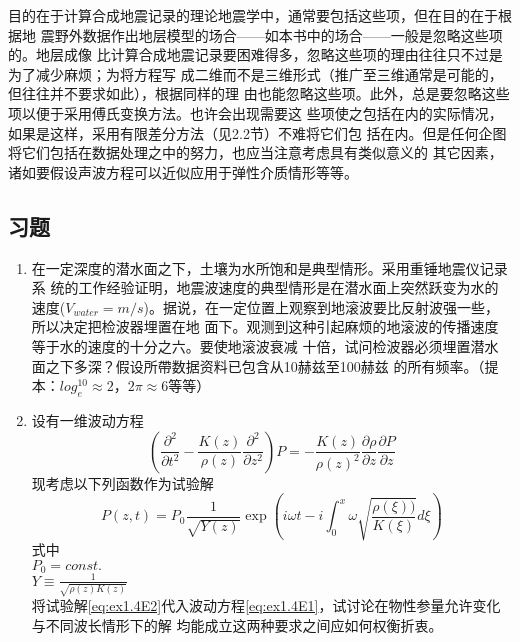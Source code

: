 目的在于计算合成地震记录的理论地震学中，通常要包括这些项，但在目的在于根据地
震野外数据作出地层模型的场合——如本书中的场合——一般是忽略这些项的。地层成像
比计算合成地震记录要困难得多，忽略这些项的理由往往只不过是为了减少麻烦；为将方程写
成二维而不是三维形式（推广至三维通常是可能的，但往往并不要求如此），根据同样的理
由也能忽略这些项。此外，总是要忽略这些项以便于采用傅氏变换方法。也许会出现需要这
些项使之包括在内的实际情况，如果是这样，采用有限差分方法（见2.2节）不难将它们包
括在内。但是任何企图将它们包括在数据处理之中的努力，也应当注意考虑具有类似意义的
其它因素，诸如要假设声波方程可以近似应用于弹性介质情形等等。

\subsection{习题}
\begin{enumerate}
\item 在一定深度的潜水面之下，土壤为水所饱和是典型情形。采用重锤地震仪记录系
统的工作经验证明，地震波速度的典型情形是在潜水面上突然跃变为水的速度($V_{water}=
m/s$)。据说，在一定位置上观察到地滚波要比反射波强一些，所以决定把检波器埋置在地
面下。观测到这种引起麻烦的地滚波的传播速度等于水的速度的十分之六。要使地滚波衰减
十倍，试问检波器必须埋置潜水面之下多深？假设所帶数据资料已包含从10赫兹至100赫兹
的所有频率。（提本：$log_e^{10}\approx 2$，$2\pi\approx 6$等等）
\item 设有一维波动方程
\begin{equation}
(\frac{\partial^2}{\partial t^2}-\frac{K(z)}{\rho(z)}\frac{\partial^2}{\partial z^2})P=
-\frac{K(z)}{\rho(z)^2}\frac{\partial \rho}{\partial z}
\frac{\partial P}{\partial z}
\label{eq:ex1.4E1}
\end{equation}
现考虑以下列函数作为试验解
\begin{equation}
P(z,t)=P_0\frac{1}{\sqrt{Y(z)}}\exp(i\omega t-i\int_0^x\omega\sqrt{\frac{\rho(\xi))}{K(\xi)}}d\xi)
\label{eq:ex1.4E2}
\end{equation}
式中\\
$P_0=const.$\\
$Y\equiv\frac{1}{\sqrt{\rho(z)K(z)}}$\\
将试验解\ref{eq:ex1.4E2}代入波动方程\ref{eq:ex1.4E1}，试讨论在物性参量允许变化与不同波长情形下的解
均能成立这两种要求之间应如何权衡折衷。
\end{enumerate}



